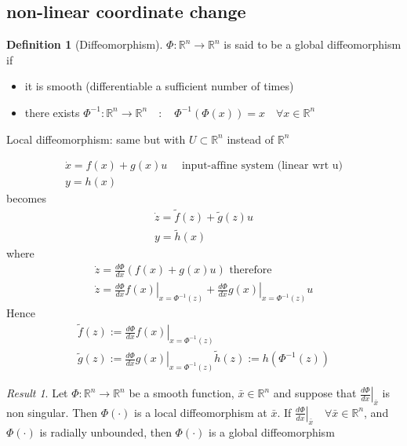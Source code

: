 \documentclass{book}
\newcommand\eval[2]{\left.#1\right|_{#2}}
\newcommand{\R}{\mathbb{R}}
\theoremstyle{definition}
\newtheorem{definition}{Definition}[section]
\theoremstyle{remark}
\theoremstyle{remark}
\newtheorem*{result}{Result}
\begin{document}
\subsection{non-linear coordinate change}
\begin{definition}[Diffeomorphism]
    $\Phi:\R^n\to\R^n$ is said to be a global diffeomorphism if
    \begin{itemize}
        \item it is smooth (differentiable a sufficient number of times)
        \item there exists $\Phi^{-1}: \R^n \to \R^n \quad :\quad \Phi^{-1}(\Phi(x))=x \quad \forall x\in\R^n$
    \end{itemize}
    Local diffeomorphism: same but with $U\subset\R^n$ instead of $\R^n$
\end{definition}
\begin{gather*}
    \dot{x}=f(x)+g(x)u \quad \text{ input-affine system (linear wrt u)}\\ 
    y=h(x)
\end{gather*}
becomes
\begin{gather*}
    \dot{z}=\tilde{f}(z)+\tilde{g}(z)u\\
    y=\tilde{h}(x)
\end{gather*}
where
\begin{gather*}
    \dot{z}=\frac{d\Phi}{dx}\left( f(x)+g(x)u \right) \text{ therefore}\\
    \dot{z}=\eval{\frac{d\Phi}{dx}f(x)}{x=\Phi^{-1}(z)}+\eval{\frac{d\Phi}{dx}g(x)}{x=\Phi^{-1}(z)}u
\end{gather*}
Hence
\begin{gather*}
    \tilde{f}(z):=\eval{\frac{d\Phi}{dx}f(x)}{x=\Phi^{-1}(z)}\\
    \tilde{g}(z):=\eval{\frac{d\Phi}{dx}g(x)}{x=\Phi^{-1}(z)}
    \tilde{h}(z):=h(\Phi^{-1}(z))
\end{gather*}

\begin{result}
    Let $\Phi:\R^n\to\R^n$ be a smooth function, $\bar{x}\in \R^n$ and suppose that $\eval{\frac{d\Phi}{dx}}{\bar{x}}$ is non singular. Then $\Phi(\cdot)$ is a local diffeomorphism at $\bar{x}$. If $\eval{\frac{d\Phi}{dx}}{\bar{x}} \quad \forall \bar{x} \in \R^n$, and $\Phi(\cdot)$ is radially unbounded, then $\Phi(\cdot)$ is a global diffeomorphism
\end{result}
\end{document}
